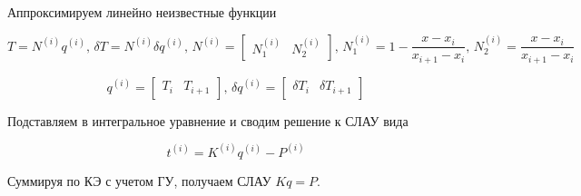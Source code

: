 \documentclass[a4paper, 12pt]{article}
\begin{document}
	Аппроксимируем линейно неизвестные функции
	
	\[
	T = N^{(i)} q^{(i)}, \, \delta T = N^{(i)} \delta q^{(i)}, \, N^{(i)} = \begin{bmatrix} N_1^{(i)} & N_2^{(i)} \end{bmatrix}, \, N_1^{(i)} = 1 - \frac{x - x_i}{x_{i+1} - x_i}, \, N_2^{(i)} = \frac{x - x_i}{x_{i+1} - x_i}
	\]
	
	\[
	q^{(i)} = \begin{bmatrix} T_i & T_{i+1} \end{bmatrix}, \, \delta q^{(i)} = \begin{bmatrix} \delta T_i & \delta T_{i+1} \end{bmatrix}
	\]
	
	Подставляем в интегральное уравнение и сводим решение к СЛАУ вида
	
	\[
 	t^{(i)}=K^{(i)}  q^{(i)} - P^{(i)}
	\]
	
	Суммируя по КЭ с учетом ГУ, получаем СЛАУ $K q = P$.
	
	
	
	
	
	
	
	
	
	
	
	
	
	
	
	
\end{document}
